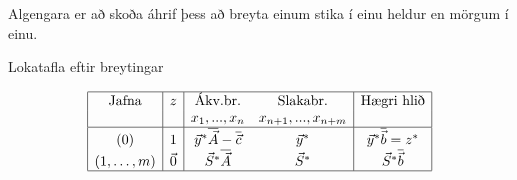 \begin{samepage}\begin{aths}Algengara er að skoða áhrif þess að breyta einum stika í einu heldur en mörgum í einu.\end{aths}\end{samepage}

\begin{samepage}
Lokatafla eftir breytingar
\begin{center}
{\renewcommand{\arraystretch}{1.5} \renewcommand{\tabcolsep}{0.2cm}
{\footnotesize
\[ \begin{array}{|c|c|cc|c|}\hline 
 \textrm{Jafna} & z & \textrm{Ákv.br.} & \textrm{Slakabr.} & \textrm{Hægri hlið} \\ 
& & x_1,...,x_n & x_{n+1},...,x_{n+m} & \\ \hline
(0) & 1 & \vec{y}^*\overline{\vec{A}}-\overline{\vec{c}} & \vec{y}^* & \vec{y}^*\overline{\vec{b}}=z^* \\
(1,\ldots,m) & \vec{0} & \vec{S}^*\overline{\vec{A}} & \vec{S}^{*} & \vec{S}^{*}\overline{\vec{b}} \\ \hline
 \end{array}\]
}}
\end{center}
\end{samepage}
